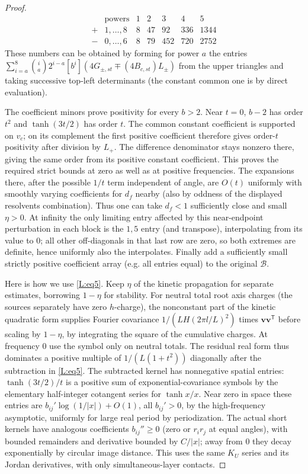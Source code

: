 \documentclass[11pt]{article}
\numberwithin{equation}{section}
\theoremstyle{definition}\newtheorem{definition}[theorem]{Definition}
\theoremstyle{remark}\newtheorem{remark}[theorem]{Remark}
\begin{document}
\begin{proof}
\[
\begin{array}{c|c|rrrrr}
 &\text{powers}&1&2&3&4&5\\\hline
 +&1,\ldots,8&8&47&92&336&1344\\
 -&0,\ldots,6&8&79&452&720&2752
\end{array}
\]
These numbers can be obtained by forming for power \(a\) the entries \(\sum_{i=a}^{8}\binom ia 2^{i-a} [b^i](4G_{\pm,st}\mp (4 B_{c,st})L_\pm)\) from the upper triangles and taking successive top-left determinants (the constant common one is by direct evaluation).

The coefficient minors prove positivity for every $b>2$.
Near $t=0$, $b-2$ has order $t^2$ and $\tanh(3t/2)$ has order $t$.
The common constant coefficient is supported on $v_c$; on its
complement the first positive coefficient therefore gives order-$t$
positivity after division by $L_+$. The difference denominator stays
nonzero there, giving the same order from its positive constant
coefficient. This proves the required strict bounds at zero as well as
at positive frequencies. The expansions there, after the possible \(1/t\) term independent of angle, are \(O(t)\) uniformly with smoothly varying coefficients for \(d_f\) nearby (also by oddness of the displayed resolvents combination). Thus one can take \(d_f<1\) sufficiently close and small \(\eta>0\). At infinity the only limiting entry affected by this near-endpoint perturbation in each block is the \(1,5\) entry (and transpose), interpolating from its value to 0; all other off-diagonals in that last row are zero, so both extremes are definite, hence uniformly also the interpolates. Finally add a sufficiently small strictly positive coefficient array (e.g. all entries equal) to the original \(\mathscr B\).

Here is how we use \eqref{L:eq5}. Keep \(\eta\) of the kinetic propagation for separate estimates, borrowing \(1-\eta\) for stability. For neutral total root axis charges (the sources separately have zero \(h\)-charge), the nonconstant part of the kinetic quadratic form supplies Fourier covariance \(1/(LH(2\pi l/L)^2)\) times \(\mathbf v\mathbf v^{\mathsf T}\) before scaling by \(1-\eta\), by integrating the square of the cumulative charges. At frequency 0 use the symbol only on neutral totals. The residual real form thus dominates a positive multiple of \(1/(L(1+t^2))\) diagonally after the subtraction in \eqref{L:eq5}. The subtracted kernel has nonnegative spatial entries: \(\tanh(3t/2)/t\) is a positive sum of exponential-covariance symbols by the elementary half-integer cotangent series for \(\tanh x/x\). Near zero in space these entries are \(b_{ij}'\log(1/|x|)+O(1)\), all \(b_{ij}'>0\), by the high-frequency asymptotic, uniformly for large real period by periodization. The actual short kernels have analogous coefficients \(b_{ij}''\ge0\) (zero or \(r_i r_j\) at equal angles), with bounded remainders and derivative bounded by \(C/|x|\); away from 0 they decay exponentially by circular image distance. This uses the same \(K_U\) series and its Jordan derivatives, with only simultaneous-layer contacts.


\end{proof}
\end{document}
